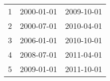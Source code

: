 % 
\begin{tabular}{ccc}
  \hline
  \hline
1 & 2000-01-01 & 2009-10-01 \\ 
  2 & 2000-07-01 & 2010-04-01 \\ 
  3 & 2006-01-01 & 2010-10-01 \\ 
  4 & 2008-07-01 & 2011-04-01 \\ 
  5 & 2009-01-01 & 2011-10-01 \\ 
   \hline
\end{tabular}
